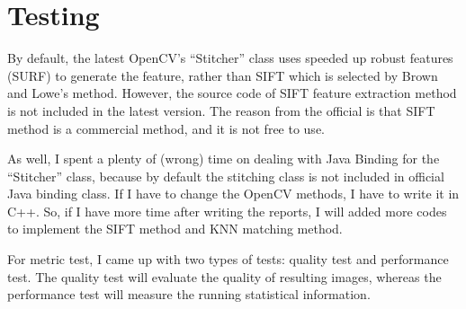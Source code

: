 \documentclass[10pt,twocolumn,letterpaper]{article}
\begin{document}
\section{Testing}
By default, the latest OpenCV's ``Stitcher'' class uses speeded up robust features (SURF) \cite{surf} to generate the feature,
rather than SIFT which is selected by Brown and Lowe's method.
However, the source code of SIFT feature extraction method is not included in the latest version.
The reason from the official \cite{cvcontri} is that SIFT method is a commercial method, and it is not free to use.

As well, I spent a plenty of (wrong) time on dealing with Java Binding for the ``Stitcher'' class,
because by default the stitching class is not included in official Java binding class.
If I have to change the OpenCV methods, I have to write it in C++.
So, if I have more time after writing the reports, I will added more codes to implement the SIFT method and KNN matching method.

For metric test, I came up with two types of tests: quality test and performance test.
The quality test will evaluate the quality of resulting images, whereas the performance test will measure the running statistical information.
\end{document}
